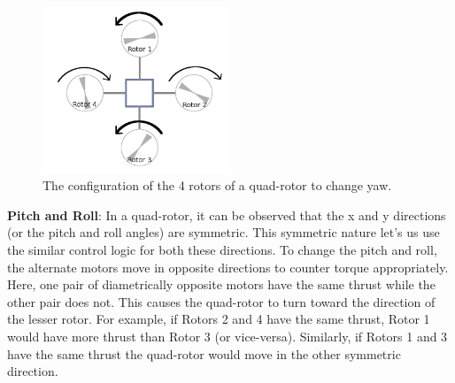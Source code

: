 \documentclass[hidelinks,BTech]{iitmdiss}
\begin{document}
\begin{figure}[H]
  \centering
    \includegraphics[width=0.5\textwidth]{quadrotor_rotors_yaw.png}
    \caption{The configuration of the 4 rotors of a quad-rotor to change yaw.}
\end{figure}

{\bf Pitch and Roll}: In a quad-rotor, it can be observed that the x and y directions (or the pitch and roll angles) are symmetric. This symmetric nature let's us use the similar control logic for both these directions. To change the pitch and roll, the alternate motors move in opposite directions to counter torque appropriately. Here, one pair of diametrically opposite motors have the same thrust while the other pair does not. This causes the quad-rotor to turn toward the direction of the lesser rotor. For example, if Rotors 2 and 4 have the same thrust, Rotor 1 would have more thrust than Rotor 3 (or vice-versa). Similarly, if Rotors 1 and 3 have the same thrust the quad-rotor would move in the other symmetric direction.
\end{document}
